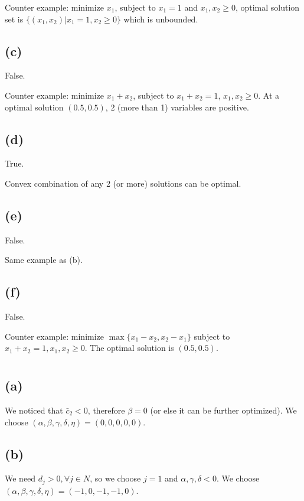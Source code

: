 \documentclass{article}
\newcommand{\1}{\bm 1}
\begin{document}
Counter example: 
minimize $x_1$, subject to $x_1=1$ and $x_1,x_2\ge0$, optimal solution set is $\{(x_1,x_2)|x_1=1,x_2\geq0\}$ which is unbounded.

\subsection*{(c)} 
False.

Counter example: minimize $x_1+x_2$, subject to $x_1 +x_2= 1$, $x_1, x_2 \geq 0$. At a optimal solution $(0.5, 0.5)$, 2 (more than 1) variables are positive.

\subsection*{(d)} 
True.

Convex combination of any 2 (or more) solutions can be optimal.

\subsection*{(e)} 
False.

Same example as (b).

\subsection*{(f)} 
False.

Counter example: minimize $\max\{x_1-x_2,x_2-x_1\}$ subject to $x_1+x_2=1,x_1,x_2\ge0$. The optimal solution is $(0.5, 0.5)$.

\section{}

\subsection*{(a)}

We noticed that $\bar c_2<0$, therefore $\beta=0$ (or else it can be further optimized). We choose $(\alpha,\beta,\gamma,\delta,\eta)=(0, 0, 0, 0, 0)$.

\subsection*{(b)}

We need $d_j>0,\forall j\in N$, so we choose $j=1$ and $\alpha,\gamma,\delta <0$. We choose $(\alpha,\beta,\gamma,\delta,\eta)=(-1, 0, -1, -1, 0)$.
\end{document}

